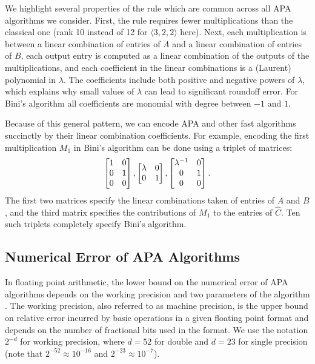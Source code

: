 \documentclass[manuscript]{acmart}
\newcommand{\dims}[1]{\langle #1 \rangle}
\begin{document}
We highlight several properties of the rule which are common across all APA algorithms we consider.
First, the rule requires fewer multiplications than the classical one (rank 10 instead of 12 for $\dims{3,2,2}$ here).
Next, each multiplication is between a linear combination of entries of $A$ and a linear combination of entries of $B$, each output entry is computed as a linear combination of the outputs of the multiplications, and each coefficient in the linear combinations is a (Laurent) polynomial in $\lambda$.
The coefficients include both positive and negative powers of $\lambda$, which explains why small values of $\lambda$ can lead to significant roundoff error.
For Bini's algorithm all coefficients are monomial with degree between $-1$ and $1$.

Because of this general pattern, we can encode APA and other fast algorithms succinctly by their linear combination coefficients.
For example, encoding the first multiplication $M_1$ in Bini's algorithm can be done using a triplet of matrices:
\begin{equation}
\label{eq:triplet}
\begin{bmatrix} 1 & 0 \\ 0 & 1 \\ 0 & 0 \end{bmatrix}, \hfill
\begin{bmatrix} \lambda & 0 \\ 0 & 1 \end{bmatrix}, \hfill
\begin{bmatrix} \lambda^{-1} & 0 \\ 0 & 1 \\ 0 & 0 \end{bmatrix}.
\end{equation}
The first two matrices specify the linear combinations taken of entries of $A$ and $B$, and the third matrix specifies the contributions of $M_1$ to the entries of $\hat C$.
Ten such triplets completely specify Bini's algorithm.

\subsection{Numerical Error of APA Algorithms}
\label{sec:APAerr}

In floating point arithmetic, the lower bound on the numerical error of APA algorithms depends on the working precision and two parameters of the algorithm \cite{BLR80}.
The working precision, also referred to as machine precision, is the upper bound on relative error incurred by basic operations in a given floating point format and depends on the number of fractional bits used in the format.
We use the notation $2^{-d}$ for working precision, where $d=52$ for double and $d=23$ for single precision (note that $2^{-52}\approx 10^{-16}$ and $2^{-23}\approx 10^{-7}$).
\end{document}
